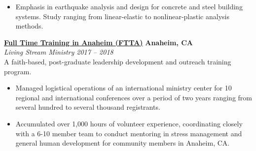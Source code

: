 \documentclass[letterpaper,6pt]{article}
\begin{document}
\begin{itemize}[itemsep=0.5mm,topsep=0pt]
    \item  Emphasis in earthquake analysis and design for concrete and steel building systems. Study ranging from linear-elastic to nonlinear-plastic analysis methods. 
\end{itemize}

\vspace{3mm}
\href{https://www.ftta.org}{\textbf{Full Time Training in Anaheim (FTTA)}} \hfill \textbf{Anaheim, CA} \\
\textit{Living Stream Ministry \hfill 2017 -- 2018} \\
A faith-based, post-graduate leadership development and outreach training program.
\vspace{1mm}
\begin{itemize}[itemsep=0.5mm,topsep=0pt]
    \item  Managed logistical operations of an international ministry center for 10 regional
        and international conferences over a period of two years ranging from several hundred to several thousand
        registrants.
\end{itemize}
\begin{itemize}[itemsep=0.5mm,topsep=0pt]
    \item  Accumulated over 1,000 hours of volunteer experience, coordinating closely with a 6-10 member team to conduct mentoring in stress management and general human development for community members in Anaheim, CA.
\end{itemize}
\end{document}
